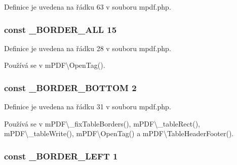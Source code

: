 Definice je uvedena na řádku 63 v souboru mpdf.\-php.

\hypertarget{mpdf_8php_a9c8972d2e42ce4b23d9db960299d9327}{
\subsubsection[{\-\_\-\-B\-O\-R\-D\-E\-R\-\_\-\-A\-L\-L}]{\setlength{\rightskip}{0pt plus 5cm}const \-\_\-\-B\-O\-R\-D\-E\-R\-\_\-\-A\-L\-L 15}}\label{mpdf_8php_a9c8972d2e42ce4b23d9db960299d9327}


Definice je uvedena na řádku 28 v souboru mpdf.\-php.



Používá se v m\-P\-D\-F\textbackslash{}\-Open\-Tag().

\hypertarget{mpdf_8php_aa10cef67d347932b52d14cab8c871852}{
\subsubsection[{\-\_\-\-B\-O\-R\-D\-E\-R\-\_\-\-B\-O\-T\-T\-O\-M}]{\setlength{\rightskip}{0pt plus 5cm}const \-\_\-\-B\-O\-R\-D\-E\-R\-\_\-\-B\-O\-T\-T\-O\-M 2}}\label{mpdf_8php_aa10cef67d347932b52d14cab8c871852}


Definice je uvedena na řádku 31 v souboru mpdf.\-php.



Používá se v m\-P\-D\-F\textbackslash{}\-\_\-fix\-Table\-Borders(), m\-P\-D\-F\textbackslash{}\-\_\-table\-Rect(), m\-P\-D\-F\textbackslash{}\-\_\-table\-Write(), m\-P\-D\-F\textbackslash{}\-Open\-Tag() a m\-P\-D\-F\textbackslash{}\-Table\-Header\-Footer().

\hypertarget{mpdf_8php_a71a5c08b796c6176539e10ab2763f2ef}{
\subsubsection[{\-\_\-\-B\-O\-R\-D\-E\-R\-\_\-\-L\-E\-F\-T}]{\setlength{\rightskip}{0pt plus 5cm}const \-\_\-\-B\-O\-R\-D\-E\-R\-\_\-\-L\-E\-F\-T 1}}\label{mpdf_8php_a71a5c08b796c6176539e10ab2763f2ef}


